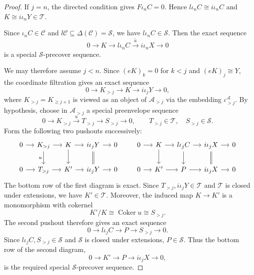 \documentclass[11pt]{amsart}
\theoremstyle{definition}
\theoremstyle{remark}
\theoremstyle{plain}
\numberwithin{equation}{section}
\begin{document}
\begin{proof}
	If $j=n$, the directed condition gives $F\iota_nC=0$.
	Hence $l\iota_nC\cong i\iota_nC$ and
	$K\cong i\iota_nY\in\mathcal{T}$.

	Since $\iota_nC\in\mathcal{C}$ and
	$l\mathcal{C}\subseteq\Delta(\mathcal{C})=\mathcal{S}$, we have $l\iota_nC\in\mathcal{S}$.
	Then the exact sequence
	\[
	0\longrightarrow K\longrightarrow l\iota_nC
	\xrightarrow{\widetilde a}i\iota_nX\longrightarrow0
	\]
	is a special $\mathcal{S}$-precover sequence.

	We may therefore assume $j<n$. Since $(eK)_k=0$ for $k<j$ and $(eK)_j\cong Y$,
	the coordinate filtration gives an exact sequence
	\[
	0\longrightarrow K_{>j}\longrightarrow K
	\longrightarrow i\iota_jY\longrightarrow0,
	\]
	where $K_{>j}=K_{\geq j+1}$ is viewed as an object of $\mathcal{A}_{>j}$ via the embedding
	$\iota^{\mathcal{A}}_{>j}$. By hypothesis, choose in $\mathcal{A}_{>j}$ a special preenvelope sequence
	\[
	0 \to K_{>j}\xrightarrow u T_{>j} \to S_{>j} \to 0,
	\qquad T_{>j} \in \mathcal{T}, \quad S_{>j} \in \mathcal{S}.
	\]
	Form the following two pushouts successively:
	\[
	\begin{tikzcd}[column sep=small]
		0\arrow[r]&K_{>j}\arrow[r]\arrow[d,"u"']&
		K\arrow[r]\arrow[d]&i\iota_jY\arrow[r]\arrow[d,equal]&0\\
		0\arrow[r]&T_{>j}\arrow[r]&K'\arrow[r]&i\iota_jY\arrow[r]&0
	\end{tikzcd}
	\qquad
	\begin{tikzcd}[column sep=small]
		0\arrow[r]&K\arrow[r]\arrow[d]&l\iota_jC\arrow[r]\arrow[d]&
		i\iota_jX\arrow[r]\arrow[d,equal]&0\\
		0\arrow[r]&K'\arrow[r]&P\arrow[r]&i\iota_jX\arrow[r]&0
	\end{tikzcd}
	\]
	The bottom row of the first diagram is exact.
	Since $T_{>j},i\iota_jY\in\mathcal{T}$ and
	$\mathcal{T}$ is closed under extensions, we have $K'\in\mathcal{T}$. Moreover, the induced map $K\to K'$ is a monomorphism with cokernel
	\[
	K'/K\cong\operatorname{Coker}u\cong S_{>j}.
	\]
	The second pushout therefore gives an exact sequence
	\[
	0\longrightarrow l\iota_jC\longrightarrow P
	\longrightarrow S_{>j}\longrightarrow0.
	\]
	Since $l\iota_jC,S_{>j}\in\mathcal{S}$ and
	$\mathcal{S}$ is closed under extensions, $P\in\mathcal{S}$. Thus the bottom row of the second diagram,
	\[
	0\longrightarrow K'\longrightarrow P
	\longrightarrow i\iota_jX\longrightarrow0,
	\]
	is the required special $\mathcal{S}$-precover sequence.
\end{proof}
\end{document}
